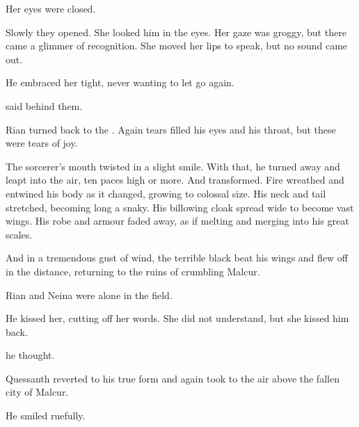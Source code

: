 Her eyes were closed. 

Slowly they opened. 
She looked him in the eyes. 
Her gaze was groggy, but there came a glimmer of recognition. 
She moved her lips to speak, but no sound came out.




He embraced her tight, never wanting to let go again. 

 said \Ishnaruchaefir{} behind them. 

Rian turned back to the \dragon. 
Again tears filled his eyes and his throat, but these were tears of joy.

The sorcerer's mouth twisted in a slight smile. 
With that, he turned away and leapt into the air, ten paces high or more. 
And transformed. 
Fire wreathed and entwined his body as it changed, growing to colossal size. 
His neck and tail stretched, becoming long a snaky. 
His billowing cloak spread wide to become vast wings. 
His robe and armour faded away, as if melting and merging into his great scales. 

And in a tremendous gust of wind, the terrible black \dragon{} beat his wings and flew off in the distance, returning to the ruins of crumbling Malcur. 


Rian and Neina were alone in the field. 



He kissed her, cutting off her words. 
She did not understand, but she kissed him back. 

 he thought. 







\new
Quessanth \Ishnaruchaefir{} reverted to his true form and again took to the air above the fallen city of Malcur. 


He smiled ruefully. 





